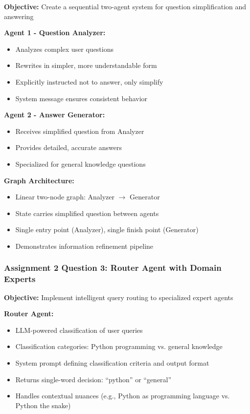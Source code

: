 \documentclass[12pt,a4paper]{article}
\begin{document}
\textbf{Objective:} Create a sequential two-agent system for question simplification and answering

\textbf{Agent 1 - Question Analyzer:}
\begin{itemize}
    \item Analyzes complex user questions
    \item Rewrites in simpler, more understandable form
    \item Explicitly instructed not to answer, only simplify
    \item System message ensures consistent behavior
\end{itemize}

\textbf{Agent 2 - Answer Generator:}
\begin{itemize}
    \item Receives simplified question from Analyzer
    \item Provides detailed, accurate answers
    \item Specialized for general knowledge questions
\end{itemize}

\textbf{Graph Architecture:}
\begin{itemize}
    \item Linear two-node graph: Analyzer $\rightarrow$ Generator
    \item State carries simplified question between agents
    \item Single entry point (Analyzer), single finish point (Generator)
    \item Demonstrates information refinement pipeline
\end{itemize}

\subsubsection{Assignment 2 Question 3: Router Agent with Domain Experts}

\textbf{Objective:} Implement intelligent query routing to specialized expert agents

\textbf{Router Agent:}
\begin{itemize}
    \item LLM-powered classification of user queries
    \item Classification categories: Python programming vs. general knowledge
    \item System prompt defining classification criteria and output format
    \item Returns single-word decision: ``python'' or ``general''
    \item Handles contextual nuances (e.g., Python as programming language vs. Python the snake)
\end{itemize}
\end{document}
